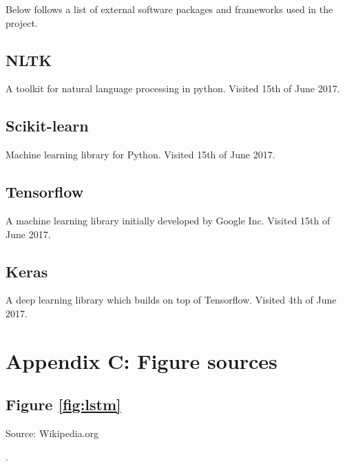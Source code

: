 \documentclass[a4paper]{article}
\begin{document}

Below follows a list of external software packages and frameworks used in
the project.

\subsection{NLTK}
A toolkit for natural language processing in python. Visited 15th of June 2017.


\subsection{Scikit-learn}
Machine learning library for Python. Visited 15th of June 2017.


\subsection{Tensorflow}
A machine learning library initially developed by Google Inc.
Visited 15th of June 2017.


\subsection{Keras}
A deep learning library which builds on top of Tensorflow.
Visited 4th of June 2017.


\pagebreak
\section{Appendix C: Figure sources}
\subsection{Figure \ref{fig:lstm}}
Source: Wikipedia.org

.
\end{document}

